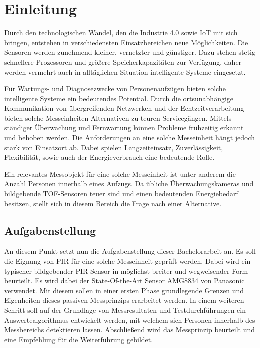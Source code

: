 \chapter{Einleitung}
\label{chap:Einleitung}


\label{sec:Ausgangssituation}
Durch den technologischen Wandel, den die Industrie 4.0 sowie \ac{IoT}  mit sich bringen, entstehen in verschiedensten Einsatzbereichen neue Möglichkeiten. Die Sensoren werden zunehmend kleiner, vernetzter und günstiger. Dazu stehen stetig schnellere Prozessoren und größere Speicherkapazitäten zur Verfügung, daher werden vermehrt auch in alltäglichen Situation intelligente Systeme eingesetzt. 

Für Wartungs- und Diagnosezwecke von Personenaufzügen bieten solche intelligente Systeme ein bedeutendes Potential. Durch die ortsunabhängige Kommunikation von übergreifenden Netzwerken und der Echtzeitverarbeitung bieten solche Messeinheiten Alternativen zu teuren Servicegängen. Mittels ständiger Überwachung und Fernwartung können Probleme frühzeitig erkannt und behoben werden. Die Anforderungen an eine solche Messeinheit hängt jedoch stark von Einsatzort ab. Dabei spielen Langzeiteinsatz, Zuverlässigkeit, Flexibilität, sowie auch der Energieverbrauch eine bedeutende Rolle.

Ein relevantes Messobjekt für eine solche Messeinheit ist unter anderem die Anzahl Personen innerhalb eines Aufzugs. Da übliche Überwachungskameras und bildgebende TOF-Sensoren teuer sind und einen bedeutenden Energiebedarf besitzen, stellt sich in diesem Bereich die Frage nach einer Alternative.

\section{Aufgabenstellung}
\label{chap:Aufgabenstellung}
An diesem Punkt setzt nun die Aufgabenstellung dieser Bachelorarbeit an. Es soll die Eignung von \ac{PIR} für eine solche Messeinheit geprüft werden. Dabei wird ein typischer bildgebender PIR-Sensor in möglichst breiter und wegweisender Form beurteilt. Es wird dabei der State-Of-the-Art Sensor AMG8834 von Panasonic verwendet. Mit diesem sollen in einer ersten Phase grundlegende Grenzen und Eigenheiten dieses passiven Messprinzips erarbeitet werden. In einem weiteren Schritt soll auf der Grundlage von Messresultaten und Testdurchführungen ein Auswertealgorithmus entwickelt werden, mit welchem sich Personen innerhalb des Messbereichs detektieren lassen. Abschließend wird das Messprinzip beurteilt und eine Empfehlung für die Weiterführung gebildet. 
